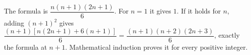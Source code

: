 The formula is $\boxed{\dfrac{n(n+1)(2n+1)}{6}}$. For $n=1$ it gives $1$. If it holds for $n$, adding $(n+1)^2$ gives $\dfrac{(n+1)[n(2n+1)+6(n+1)]}{6}=\dfrac{(n+1)(n+2)(2n+3)}{6}$, exactly the formula at $n+1$. Mathematical induction proves it for every positive integer.
